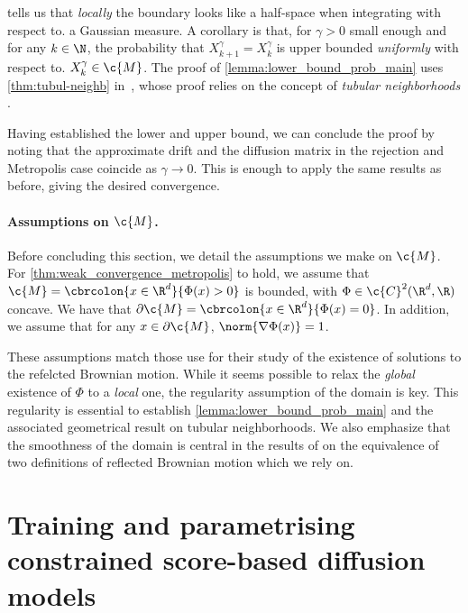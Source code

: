  tells us that \emph{locally} the boundary
looks like a half-space when integrating with respect to. a Gaussian measure.
A corollary is that, for \(\gamma > 0\) small enough and for any \(k \in \N\), the probability that \(X_{k+1}^\gamma = X_k^\gamma\) is upper bounded \emph{uniformly} with respect to.
\(X_k^\gamma \in \c{M}\).
The proof of \cref{lemma:lower_bound_prob_main} uses \cref{thm:tubul-neighb} in~, whose proof relies on the concept of \emph{tubular neighborhoods} \parencite{lee2013smooth}.

Having established the lower and upper bound, we can conclude the proof by noting that the approximate drift and the diffusion matrix in the rejection and Metropolis case coincide as \(\gamma \to 0\).
This is enough to apply the same results as before, giving the desired convergence.

\paragraph{Assumptions on \(\c{M}\).}
Before concluding this section, we detail the assumptions we make on \(\c{M}\).
For \cref{thm:weak_convergence_metropolis} to hold, we assume that \(\c{M} = \cbrcolon{x \in \R^d}{\Phi(x) > 0}\) is bounded, with \(\Phi \in \c{C}^2(\R^d, \R)\) concave.
We have that \(\partial \c{M} = \cbrcolon{x \in \R^d}{\Phi(x) = 0}\).
In addition, we assume that for any \(x \in \partial \c{M}\), \(\norm{\nabla \Phi(x)} = 1\).

These assumptions match those \cite{stroock1971diffusion} use for their study of the existence of solutions to the refelcted Brownian motion.
While it seems possible to relax the \emph{global} existence of \(\Phi\) to a \emph{local} one, the regularity assumption of the domain is key.
This regularity is essential to establish \cref{lemma:lower_bound_prob_main} and the associated geometrical result on tubular neighborhoods.
We also emphasize that the smoothness of the domain is central in the results of \cite{kang2017submartingale} on the equivalence of two definitions of reflected Brownian motion which we rely on.

\section{Training and parametrising constrained score-based diffusion models}
\label{sec:score-netw-param}

